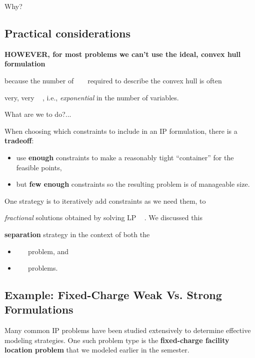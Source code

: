 \documentclass[11pt]{article}
\theoremstyle{definition}
\newcommand{\answerbox}[3]{%
  \fbox{%
    \begin{minipage}[#1]{#2}
      \hfill\vspace{#3}
    \end{minipage}
  }
}
\newcommand{\answerboxfull}[2]{%
  \answerbox{#1}{6.38in}{#2} 
}
\newcommand{\wordbox}{\answerbox{c}{1.2in}{.7cm}}
\begin{document}
Why?

\answerboxfull{c}{2cm}

\vfill

\subsection{Practical considerations}

\begin{tcolorbox}
\textbf{HOWEVER, for most problems we can't use the ideal, convex hull formulation}

because the number of ~\wordbox~ required to describe the convex hull is often 

very, very ~\wordbox, i.e., \emph{exponential} in the number of variables.
\end{tcolorbox}

What are we to do?...
\vfill


When choosing which constraints to include in an IP formulation, there is a \textbf{tradeoff}:
\begin{itemize}
	\item use \textbf{enough} constraints to make a reasonably tight ``container'' for the feasible points,
	\item but \textbf{few enough} constraints so the resulting problem is of manageable size.
\end{itemize}

\vfill


One strategy is to iteratively add constraints as we need them, to ~\wordbox 

\emph{fractional} solutions obtained by solving LP ~\wordbox.  We discussed this

\textbf{separation} strategy in the context of both the 

\begin{itemize}
	\item \wordbox~\wordbox~ problem, and
	\item \wordbox~\wordbox~ problems.
\end{itemize}

\vfill

\newpage

\subsection{Example:  Fixed-Charge Weak Vs. Strong Formulations}
Many common IP problems have been studied extensively to determine effective modeling strategies.  One such problem type is the \textbf{fixed-charge facility location problem} that we modeled earlier in the semester.  
\end{document}

